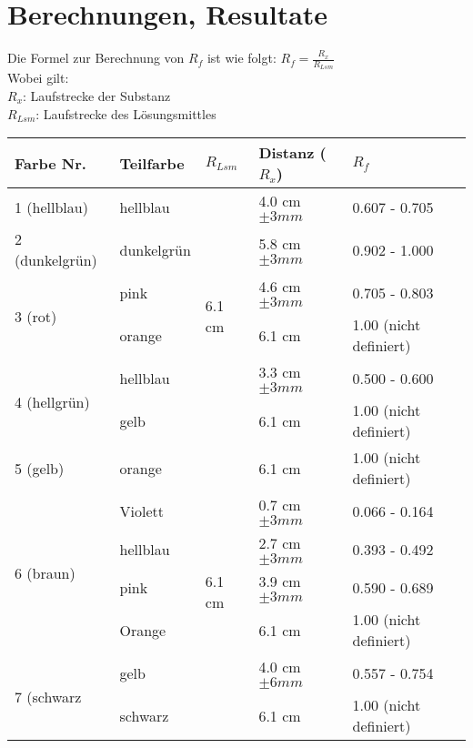 \documentclass[11pt,paper=a4,final]{scrartcl}
\begin{document}
\section{Berechnungen, Resultate}
Die Formel zur Berechnung von \(R_f\) ist wie folgt: \(R_f = \frac{R_x}{R_{Lsm}} \) \\
Wobei gilt:\\
\(R_x\): Laufstrecke der Substanz\\
\(R_{Lsm}\): Laufstrecke des L\"osungsmittles

\begin{savenotes} %
  \begin{table}[ht]
    \centering
    \begin{tabular}{|l|l|l|l|l|}
      \hline
    \bf Farbe Nr.	& \bf Teilfarbe	& \bf \(R_{Lsm}\)		& \bf Distanz (\(R_x\))	& \bf \(R_f\)		\\ \hline
      1 (hellblau)	& hellblau	& \multirow{6}{*}{6.1 cm }	& 4.0 cm \(\pm 3 mm \)	& 0.607 - 0.705		\\ \cline{1-2} \cline{4-5}
      2 (dunkelgr\"un)	& dunkelgr\"un	&				& 5.8 cm \(\pm 3 mm \)	& 0.902 - 1.000		\\ \cline{1-2} \cline{4-5}
      \multirow{2}{*}{3 (rot) }
			& pink		&				& 4.6 cm \(\pm 3 mm \)	& 0.705 - 0.803		\\ 
			& orange	&				& 6.1 cm 		& 1.00 (nicht definiert)\\ \cline{1-2} \cline{4-5}
      \multirow{2}{*}{4 (hellgr\"un) }
 			& hellblau	&				& 3.3 cm \(\pm 3 mm \)	& 0.500 - 0.600		\\
			& gelb		&				& 6.1 cm		& 1.00 (nicht definiert)\\ \hline
      5 (gelb)		& orange	& \multirow{10}{*}{6.1 cm }	& 6.1 cm		& 1.00 (nicht definiert)\\ \cline{1-2} \cline{4-5}
      \multirow{4}{*}{6 (braun)}
			& Violett	&				& 0.7 cm \(\pm 3 mm \)	& 0.066 - 0.164		\\
			& hellblau	&				& 2.7 cm \(\pm 3 mm \)	& 0.393 - 0.492		\\
      			& pink		&				& 3.9 cm \(\pm 3 mm \)	& 0.590 - 0.689		\\
      			& Orange	&				& 6.1 cm 		& 1.00 (nicht definiert)\\ \cline{1-2} \cline{4-5}
      \multirow{2}{*}{7 (schwarz}
      			& gelb		&				& 4.0 cm \(\pm 6 mm \)	& 0.557 - 0.754		\\
      			& schwarz	&				& 6.1 cm		& 1.00 (nicht definiert)\\ \cline{1-2} \cline{4-5}

\end{tabular}
\end{table}
\end{savenotes}
\end{document}
